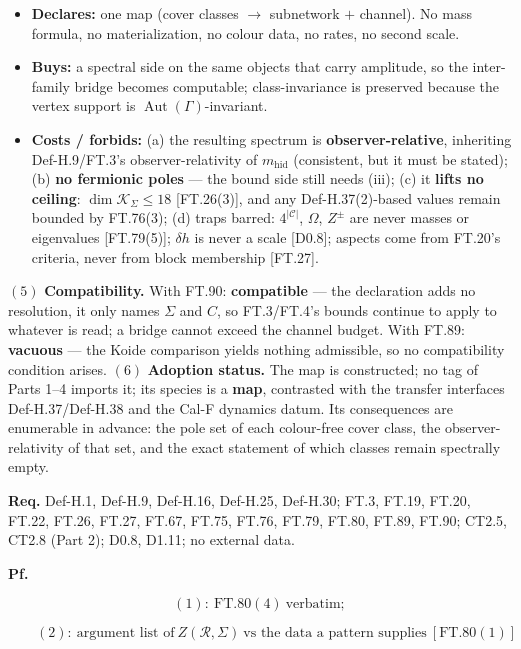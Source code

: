 \begin{theorem}
\begin{itemize}
\item \textbf{Declares:} one map (cover classes $\to$ subnetwork $+$ channel). No mass formula, no materialization, no colour data, no rates, no second scale.
\item \textbf{Buys:} a spectral side on the same objects that carry amplitude, so the inter-family bridge becomes computable; class-invariance is preserved because the vertex support is $\operatorname{Aut}(\Gamma)$-invariant.
\item \textbf{Costs / forbids:} (a) the resulting spectrum is \textbf{observer-relative}, inheriting Def-H.9/FT.3's observer-relativity of $m_{\mathrm{hid}}$ (consistent, but it must be stated); (b) \textbf{no fermionic poles} — the bound side still needs (iii); (c) it \textbf{lifts no ceiling}: $\dim\mathcal K_\Sigma\le18$ [FT.26(3)], and any Def-H.37(2)-based values remain bounded by FT.76(3); (d) traps barred: $4^{|\mathcal C|}$, $\Omega$, $Z^\pm$ are never masses or eigenvalues [FT.79(5)]; $\delta h$ is never a scale [D0.8]; aspects come from FT.20's criteria, never from block membership [FT.27].
\end{itemize}

$(5)$ \textbf{Compatibility.} With FT.90: \textbf{compatible} — the declaration adds no resolution, it only names $\Sigma$ and $C$, so FT.3/FT.4's bounds continue to apply to whatever is read; a bridge cannot exceed the channel budget. With FT.89: \textbf{vacuous} — the Koide comparison yields nothing admissible, so no compatibility condition arises. $(6)$ \textbf{Adoption status.} The map is constructed; no tag of Parts 1–4 imports it; its species is a \textbf{map}, contrasted with the transfer interfaces Def-H.37/Def-H.38 and the Cal-F dynamics datum. Its consequences are enumerable in advance: the pole set of each colour-free cover class, the observer-relativity of that set, and the exact statement of which classes remain spectrally empty.

\textbf{Req.} Def-H.1, Def-H.9, Def-H.16, Def-H.25, Def-H.30; FT.3, FT.19, FT.20, FT.22, FT.26, FT.27, FT.67, FT.75, FT.76, FT.79, FT.80, FT.89, FT.90; CT2.5, CT2.8 (Part 2); D0.8, D1.11; no external data.

\textbf{Pf.}

\[
(1):\ \mathrm{FT.80}(4)\ \text{verbatim};
\]

\[
\qquad (2):\ \text{argument list of}\ Z(\mathcal R,\Sigma)\ \text{vs the data a pattern supplies}\ [\mathrm{FT.80}(1)]
\]


\end{theorem}
